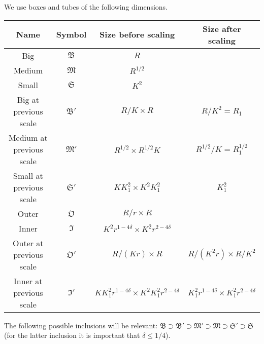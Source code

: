 \documentclass[biblatex]{pzorin-note}
\newcommand{\bB}{\mathfrak{B}} %
\newcommand{\bM}{\mathfrak{M}} %
\newcommand{\bS}{\mathfrak{S}} %
\newcommand{\bBp}{\mathfrak{B}'} %
\newcommand{\bMp}{\mathfrak{M}'} %
\newcommand{\bSp}{\mathfrak{S}'} %
\newcommand{\bO}{\mathfrak{O}} %
\newcommand{\bI}{\mathfrak{I}} %
\newcommand{\bOp}{\mathfrak{O}'} %
\newcommand{\bIp}{\mathfrak{I}'} %
\begin{document}
We use boxes and tubes of the following dimensions.
\begin{center}
\begin{tabular}{cccc} \toprule
  Name & Symbol & Size before scaling & Size after scaling\\ \midrule
  Big & $\bB$ & $R$ & \\
  Medium & $\bM$ & $R^{1/2}$ & \\
  Small & $\bS$ & $K^{2}$ & \\
  Big at previous scale & $\bBp$ & $R/K \times R$ & $R/K^{2} = R_{1}$\\
  Medium at previous scale & $\bMp$ & $R^{1/2} \times R^{1/2}K$ & $R^{1/2}/K = R_{1}^{1/2}$\\
  Small at previous scale & $\bSp$ & $KK_{1}^{2} \times K^{2}K_{1}^{2}$ & $K_{1}^{2}$\\ \midrule
  Outer & $\bO$ & $R/r \times R$ & \\
  Inner & $\bI$ & $K^{2} r^{1-4\delta} \times K^{2} r^{2-4\delta}$ & \\
  Outer at previous scale& $\bOp$ & $R/(Kr) \times R$ & $R/(K^{2}r) \times R/K^{2}$\\
  Inner at previous scale & $\bIp$ & $K K_{1}^{2} r^{1-4\delta} \times K^{2} K_{1}^{2} r^{2-4\delta}$ & $K_{1}^{2} r^{1-4\delta} \times K_{1}^{2} r^{2-4\delta}$\\
  \bottomrule
\end{tabular}
\end{center}
The following possible inclusions will be relevant: $\bB \supset \bBp \supset \bMp \supset \bM \supset \bSp \supset \bS$ (for the latter inclusion it is important that $\delta \leq 1/4$).
\end{document}
